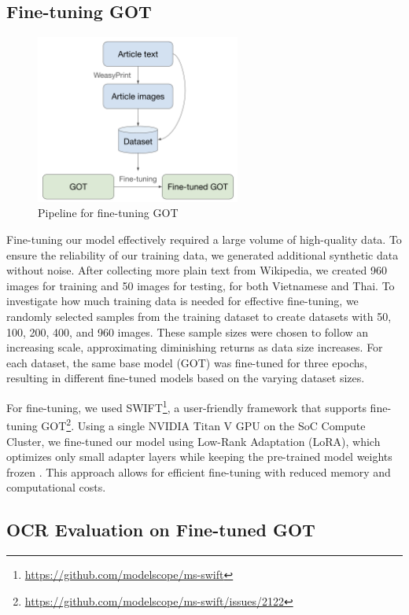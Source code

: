 \documentclass[12pt,oneside]{memoir}
\begin{document}
\subsection{Fine-tuning GOT}

\begin{figure}[ht]
    \centering
    \includegraphics[width=0.6\textwidth]{images/fine-tuning.png}
    \caption{Pipeline for fine-tuning GOT}
    \label{figure:fine-tuning}
\end{figure}

Fine-tuning our model effectively required a large volume of high-quality data. 
To ensure the reliability of our training data, we generated additional synthetic data without noise. 
After collecting more plain text from Wikipedia, we created 960 images for training and 50 images for testing, for both Vietnamese and Thai.
To investigate how much training data is needed for effective fine-tuning, we randomly selected samples from the training dataset to create datasets with 50, 100, 200, 400, and 960 images. 
These sample sizes were chosen to follow an increasing scale, approximating diminishing returns as data size increases.
For each dataset, the same base model (GOT) was fine-tuned for three epochs, resulting in different fine-tuned models based on the varying dataset sizes.

For fine-tuning, we used SWIFT\footnote{\url{https://github.com/modelscope/ms-swift}}, a user-friendly framework that supports fine-tuning GOT\footnote{\url{https://github.com/modelscope/ms-swift/issues/2122}}. 
Using a single NVIDIA Titan V GPU on the SoC Compute Cluster, we fine-tuned our model using Low-Rank Adaptation (LoRA), which optimizes only small adapter layers while keeping the pre-trained model weights frozen \parencite{hu-etal-2021}.
This approach allows for efficient fine-tuning with reduced memory and computational costs.

\subsection{OCR Evaluation on Fine-tuned GOT}
\end{document}

